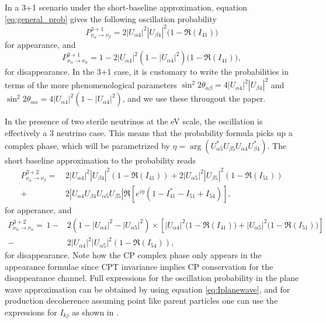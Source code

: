In a 3+1 scenario under the short-baseline approximation, equation \ref{eq:general_prob} gives the following oscillation probability
%
\begin{equation} \label{eq:app3+1}
P^{3+1}_{\nu_{\alpha} \to \nu_{\beta}} = 2 |U_{\alpha 4}|^2 |U_{\beta 4}|^2 \big(1 -\Re(I_{41}) \big)
\end{equation}
%
for appearance, and
%
\begin{equation} \label{eq:dis3+1}
P^{3+1}_{\nu_{\alpha} \to \nu_{\alpha}} = 1 - 2|U_{\alpha 4}|^2(1 - |U_{\alpha 4}|^2) \big(1 -\Re(I_{41}) \big),
\end{equation}
%
for disappearance. In the 3+1 case, it is customary to write the probabilities in terms of the more phenomenological parameters $\sin^2 {2 \theta_{\alpha \beta}} = 4 |U_{\alpha 4}|^2 |U_{\beta 4}|^2 $ and $\sin^2 {2 \theta_{\alpha \alpha}} = 4 |U_{\alpha 4}|^2(1 - |U_{\alpha 4}|^2) $, and we use these througout the paper.

In the presence of two sterile neutrinos at the eV scale, the oscillation is effectively a 3 neutrino case. This means that the probability formula picks up a complex phase, which will be parametrized by $\eta = \arg{(U_{\alpha 5}^* U_{\beta 5} U_{\alpha 4} U_{\beta 4}^*)}$. The short baseline approximation to the probability reads
%
\begin{align}
P^{3+2}_{\nu_{\alpha} \to \nu_{ \beta}}  =\, &2 \left|U_{\alpha 4}\right|^2 \left|U_{\beta 4}\right|^2 \left(1 - \Re(I_{4 1}) \right) + 2 \left|U_{\alpha 5}\right|^2 \left|U_{\beta 5}\right|^2 (1 - \Re(I_{5 1})) \nonumber \\
+ &2 \left| U_{\alpha 4} U_{\beta 4} U_{\alpha 5} U_{\beta 5}\right|  \Re\left[ e^{i \eta} \left( 1 - I_{41}^* - I_{51} + I_{54} \right) \right],
\end{align}
%
for apperance, and
%
\begin{align}
P^{3+2}_{\nu_{\alpha} \to \nu_{ \alpha}}  =\,1 - &2(1 - |U_{\alpha 4}|^2 - |U_{\alpha 5}|^2) \times \left[ |U_{\alpha 4}|^2 \big(1 - \Re(I_{41}))  + |U_{\alpha 5}|^2 \big( 1 - \Re(I_{51}) \big)\right] \nonumber \\ - &2 |U_{\alpha 4}|^2 |U_{\alpha 5}|^2 \left(1 - \Re(I_{54})\right), 
\end{align}
%
for disappearance. Note how the CP complex phase only appears in the appearance formulae since CPT invariance implies CP conservation for the disappearance channel. Full expressions for the oscillation probability in the plane wave approximation can be obtained by using equation \ref{eq:Iplanewave}, and for production decoherence assuming point like parent particles one can use the expressions for $I_{k j}$ as shown in .

